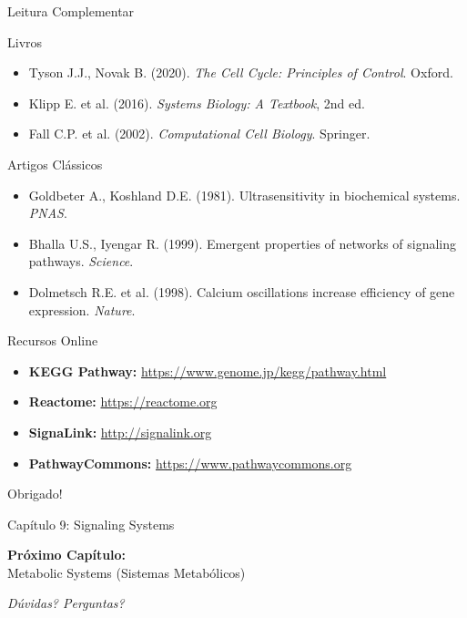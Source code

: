 \begin{frame}{Leitura Complementar}
\begin{block}{Livros}
\begin{itemize}
    \item Tyson J.J., Novak B. (2020). \textit{The Cell Cycle: Principles of Control}. Oxford.
    \item Klipp E. et al. (2016). \textit{Systems Biology: A Textbook}, 2nd ed.
    \item Fall C.P. et al. (2002). \textit{Computational Cell Biology}. Springer.
\end{itemize}
\end{block}

\begin{block}{Artigos Clássicos}
\begin{itemize}
    \item Goldbeter A., Koshland D.E. (1981). Ultrasensitivity in biochemical systems. \textit{PNAS}.
    \item Bhalla U.S., Iyengar R. (1999). Emergent properties of networks of signaling pathways. \textit{Science}.
    \item Dolmetsch R.E. et al. (1998). Calcium oscillations increase efficiency of gene expression. \textit{Nature}.
\end{itemize}
\end{block}

\begin{block}{Recursos Online}
\begin{itemize}
    \item \textbf{KEGG Pathway:} \url{https://www.genome.jp/kegg/pathway.html}
    \item \textbf{Reactome:} \url{https://reactome.org}
    \item \textbf{SignaLink:} \url{http://signalink.org}
    \item \textbf{PathwayCommons:} \url{https://www.pathwaycommons.org}
\end{itemize}
\end{block}
\end{frame}

\begin{frame}
\begin{center}
{\Huge Obrigado!}

\vspace{1cm}

{\Large Capítulo 9: Signaling Systems}

\vspace{1cm}

\textbf{Próximo Capítulo:}\\
Metabolic Systems (Sistemas Metabólicos)

\vspace{1cm}

\textit{Dúvidas? Perguntas?}
\end{center}
\end{frame}


